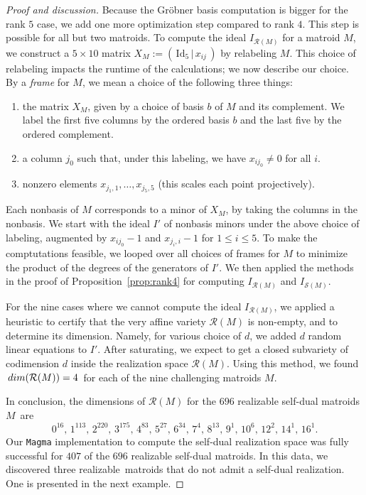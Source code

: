 \documentclass[12pt]{extarticle}
\theoremstyle{definition}
\numberwithin{theorem}{section}
\theoremstyle{plain}\newtheorem{ithm}{Theorem}
\begin{document}
\begin{proof}[Proof and discussion]
Because the Gr\"{o}bner basis computation is bigger for the rank $5$ case, we add one more optimization step compared to rank $4$. This step is possible for all but two matroids.
To compute the ideal  $I_{\mathcal{R}(M)}$ 
 for a matroid $M$, we construct a $5 \times 10$ matrix
$ X_M := (\,\text{Id}_5 \,| \, x_{ij} \,) $ by relabeling $M$. This choice of relabeling impacts the runtime of the calculations; we now describe our choice.
By a \emph{frame} for $M$, we mean a choice of the following three things:
\begin{enumerate}
  \item the matrix $X_M$, given by a choice of basis $b$ of $M$ and its complement. We  label the first five columns by the ordered basis  $b$ and the last five by the ordered complement.
  \item a column $j_0$ such that, under this labeling, we have $x_{ij_0} \neq 0$ for all $i$.
  \item nonzero elements $x_{j_1, 1}, \dots, x_{j_5, 5}$ (this scales each point projectively).
\end{enumerate} 
Each nonbasis of $M$ corresponds to a minor of $X_M$, by taking the columns in the nonbasis.
We start with the ideal $I'$ of
 nonbasis minors under the above choice of labeling, augmented by $x_{ij_0} -1$ and $x_{j_i, i} -1 $ for $1 \leq i \leq 5$. 
To make the comptutations feasible, we looped over all choices of frames for $M$ to minimize the product of the degrees of the 
generators of $I'$.  We then applied the methods in the proof of Proposition~\ref{prop:rank4}
for computing $I_{\mathcal{R}(M)}$ and $I_{\mathcal{S}(M)}$.

For the nine cases where we cannot compute 
the ideal $I_{\mathcal{R}(M)}$,
 we applied a heuristic to certify that the
very affine variety $\mathcal{R}(M)$ is non-empty, and to  determine its dimension.
 Namely, for various choice of $d$, we added $d$ random linear equations to $I'$.
After saturating, we expect to get a closed subvariety of codimension $d$
inside the realization space $\mathcal{R}(M)$. Using this method, we found 
$\,{\rm dim}(\mathcal{R}(M)) = 4\,$ for each of the
nine challenging matroids $M$.

In conclusion,
the dimensions of  $\mathcal{R}(M)$ for the $696$ realizable
self-dual matroids $M$~are 
\begin{equation}
\label{eq:dimR(M)}
 0^{16}, \,1^{113},\, 2^{220}, \,3^{175}, \, 4^{83},\, 5^{27},\, 6^{34}, \, 7^4,\, 8^{13},\, 9^1, \,10^6,\, 12^2,\, 14^1, \,16^1.
 \end{equation}
 Our {\tt Magma} implementation to compute the self-dual realization space was fully successful for $407$ of the $696$ realizable
self-dual matroids. 
In this data, we discovered three realizable~matroids that do not
admit a self-dual realization. One is presented in the next example.
\end{proof}
\end{document}
